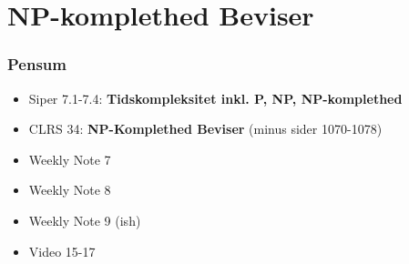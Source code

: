 \section{NP-komplethed Beviser}%
\label{sec:npkomplethed}

\begin{frame}
  \frametitle{Pensum}
  \begin{itemize}
    \item Siper 7.1-7.4: \textbf{Tidskompleksitet inkl. P, NP, NP-komplethed}
    \item CLRS 34: \textbf{NP-Komplethed Beviser} (minus sider 1070-1078)
    \item Weekly Note 7
    \item Weekly Note 8
    \item Weekly Note 9 (ish)
    \item Video 15-17
  \end{itemize}
\end{frame}




